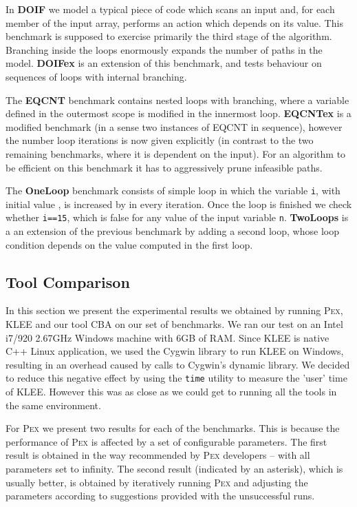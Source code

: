 \documentclass{llncs}
\newcommand{\Pex}{\textsc{Pex}\xspace}
\newcommand{\Klee}{\textsc{KLEE}\xspace}
\newcommand{\CBATool}{\textsc{CBA}\xspace}
\begin{document}
In \textbf{DOIF} we model a typical piece of code which scans an input and,
for each member of the input array, performs an action which depends on its
value. This benchmark is supposed to exercise primarily the third stage of
the algorithm.  Branching inside the loops enormously expands the number of
paths in the model. \textbf{DOIFex} is an extension of this benchmark, and
tests behaviour on sequences of loops with internal branching.

The \textbf{EQCNT} benchmark contains nested loops with branching, where a
variable defined in the outermost scope is modified in the innermost
loop. \textbf{EQCNTex} is a modified benchmark (in a sense two instances of
EQCNT in sequence), however the number loop iterations is now given
explicitly (in contrast to the two remaining benchmarks, where it is
dependent on the input). For an algorithm to be efficient on this benchmark
it has to aggressively prune infeasible paths.

The \textbf{OneLoop} benchmark consists of simple loop in which the variable
\texttt{i}, with initial value , is increased by  in every
iteration. Once the loop is finished we check whether \texttt{i==15}, which
is false for any value of the input variable \texttt{n}. 
 \textbf{TwoLoops} is a an
extension of the previous benchmark by adding a second loop, whose
loop condition depends on the value computed in the first loop.

\subsection{Tool Comparison}
In this section we present the experimental results we obtained by running
\Pex, \Klee and our tool \CBATool on our set of benchmarks.
 We ran our test on an Intel i7/920 2.67GHz Windows machine with 6GB
of RAM. 
Since \Klee is native C++ Linux application, we used the Cygwin library to
run \Klee on Windows, resulting in an overhead caused by calls to Cygwin's dynamic library. We
decided to reduce this negative effect by using the \texttt{time} utility to
measure the 'user' time of \Klee. However this was as close as we could get
to running all the tools in the same environment.

For \Pex we present two results for each of the benchmarks. This is because
the performance of \Pex is affected by a set of configurable
parameters. The first result is obtained in the way recommended by \Pex
developers -- with all parameters set to infinity. The second result
(indicated by an asterisk), which
is usually better, is obtained by iteratively running \Pex and adjusting the
parameters according to suggestions provided with the unsuccessful runs.
\end{document}
